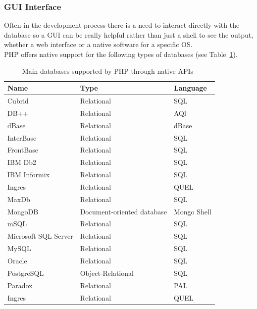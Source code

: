 \documentclass[11]{article}
\begin{document}
	\subsubsection{GUI Interface \\}
	Often in the development process there is a need to interact directly with the database so a GUI can be really helpful rather than just a shell to see the output, whether a web interface or a native software for a specific OS.\\

	PHP offers native support for the following types of databases (see Table~\ref{phpDbSupp}).

		\begin{table}[H]
			\caption{Main databases supported by PHP through native APIs~\citep{PhpDbs}}
			\label{phpDbSupp}
			  \centering
				\begin{tabular}{|l|l|l|}
					\hline
					\textbf{Name} & \textbf{Type} & \textbf{Language}\\
					\hline
					Cubrid & Relational & SQL\\
					\hline
					DB++ & Relational & AQl\\
					\hline
					dBase & Relational & dBase\\
					\hline
					InterBase & Relational & SQL\\
					\hline 
					FrontBase & Relational & SQL\\
					\hline 
					IBM Db2 & Relational & SQL\\
					\hline 
					IBM Informix & Relational & SQL\\
					\hline 
					Ingres & Relational & QUEL\\
					\hline 
					MaxDb & Relational & SQL\\
					\hline 
					MongoDB & Document-oriented database & Mongo Shell\\
					\hline 
					mSQL & Relational & SQL\\
					\hline 
					Microsoft SQL Server & Relational & SQL\\
					\hline 
					MySQL& Relational & SQL\\
					\hline 
					Oracle  & Relational & SQL\\
					\hline 
					PostgreSQL  & Object-Relational & SQL\\
					\hline 
					Paradox  & Relational & PAL\\
					\hline 
					Ingres & Relational & QUEL\\
					\hline 
				\end{tabular}
		\end{table}
\end{document}

